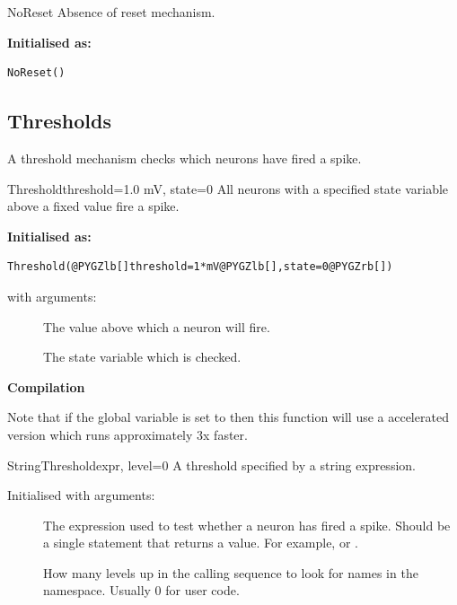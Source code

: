 \documentclass[letterpaper,10pt,english]{manual}
\begin{document}
\hypertarget{brian.NoReset}{}\begin{classdesc}{NoReset}{}
Absence of reset mechanism.

\textbf{Initialised as:}

\begin{Verbatim}[commandchars=@\[\]]
NoReset()
\end{Verbatim}
\end{classdesc}

\subsection{Thresholds}

A threshold mechanism checks which neurons have fired a
spike.

\hypertarget{brian.Threshold}{}\begin{classdesc}{Threshold}{threshold=1.0 mV, state=0}
All neurons with a specified state variable above a fixed value fire a spike.

\textbf{Initialised as:}

\begin{Verbatim}[commandchars=@\[\]]
Threshold(@PYGZlb[]threshold=1*mV@PYGZlb[],state=0@PYGZrb[])
\end{Verbatim}

with arguments:
\begin{description}
\item[]
The value above which a neuron will fire.

\item[]
The state variable which is checked.

\end{description}

\textbf{Compilation}

Note that if the global variable  is set to 
then this function will use a  accelerated version which
runs approximately 3x faster.
\end{classdesc}

\hypertarget{brian.StringThreshold}{}\begin{classdesc}{StringThreshold}{expr, level=0}
A threshold specified by a string expression.

Initialised with arguments:
\begin{description}
\item[]
The expression used to test whether a neuron has fired a spike.
Should be a single statement that returns a value. For example,
 or .

\item[]
How many levels up in the calling sequence to look for
names in the namespace. Usually 0 for user code.

\end{description}
\end{classdesc}
\end{document}
